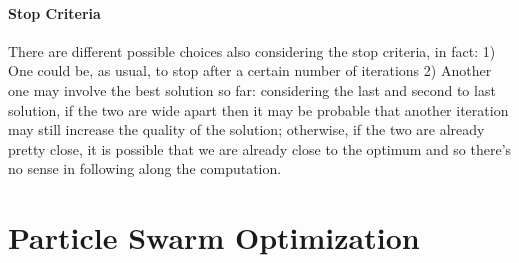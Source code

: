 \documentclass[12pt,a4paper]{report}
\begin{document}
\paragraph{Stop Criteria}
There are different possible choices also considering the stop criteria, in fact: 1) One could be, as usual, to stop after a certain number of iterations 2) Another one may involve the best solution so far: considering the last and second to last solution, if the two are wide apart then it may be probable that another iteration may still increase the quality of the solution; otherwise, if the two are already pretty close, it is possible that we are already close to the optimum and so there's no sense in following along the computation.

\section{Particle Swarm Optimization}
\end{document}
